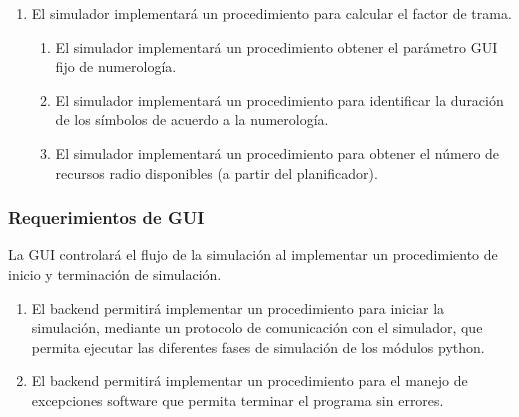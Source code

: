 \begin{enumerate}
\begin{enumerate}
\begin{enumerate}
                                \item El simulador implementará un procedimiento para calcular el factor de trama.
                                    \begin{enumerate}            
                                        \item El simulador implementará un procedimiento obtener el parámetro GUI fijo de numerología.
                                        \item El simulador implementará un procedimiento para identificar la duración de los símbolos de acuerdo a la numerología.
                                        \item El simulador implementará un procedimiento para obtener el número de recursos radio disponibles (a partir del planificador).
                                    \end{enumerate}
                                    
                            \end{enumerate}
                        
                    \end{enumerate}
                

\end{enumerate}

\subsubsection{Requerimientos de GUI}

    La GUI controlará el flujo de la simulación al implementar un procedimiento  de inicio y terminación de simulación.
    \begin{enumerate}
        \item El backend permitirá implementar un procedimiento para iniciar la simulación, mediante un protocolo de comunicación con el simulador, que permita ejecutar las diferentes fases de simulación de los módulos python. %
        \item El backend permitirá implementar un procedimiento para el manejo de excepciones software que permita terminar el programa sin errores. %
    \end{enumerate}
    
